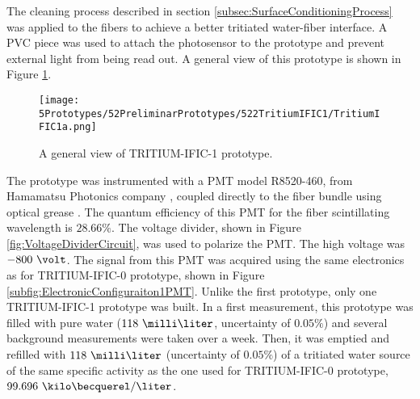 The cleaning process described in section \ref{subsec:SurfaceConditioningProcess} was applied to the fibers to achieve a better tritiated water-fiber interface. A PVC piece was used to attach the photosensor to the prototype and prevent external light from being read out. A general view of this prototype is shown in Figure \ref{fig:TritumIFIC1}.

\begin{figure}[h]
\centering
\texttt{[image: 5Prototypes/52PreliminarPrototypes/522TritiumIFIC1/TritiumIFIC1a.png]}
\caption{A general view of TRITIUM-IFIC-1 prototype.\label{fig:TritumIFIC1}}
\end{figure}



The prototype was instrumented with a PMT model R8520-460, from Hamamatsu Photonics company \cite{DataSheetPMTs}, coupled directly to the fiber bundle using optical grease \cite{OpticalGrease}. The quantum efficiency of this PMT for the fiber scintillating wavelength is $28.66\%$.  The voltage divider, shown in Figure \ref{fig:VoltageDividerCircuit}, was used to polarize the PMT. The high voltage was $-800~\volt$. The signal from this PMT was acquired using the same electronics as for TRITIUM-IFIC-0 prototype, shown in Figure \ref{subfig:ElectronicConfiguraiton1PMT}. Unlike the first prototype, only one TRITIUM-IFIC-1 prototype was built. In a first measurement, this prototype was filled with pure water ($118~\milli\liter$, uncertainty of $0.05\%$) and several background measurements were taken over a week. Then, it was emptied and refilled with $118~\milli\liter$ (uncertainty of $0.05\%$) of a tritiated water source of the same specific activity as the one used for TRITIUM-IFIC-0 prototype, $99.696~\kilo\becquerel/\liter$. 

